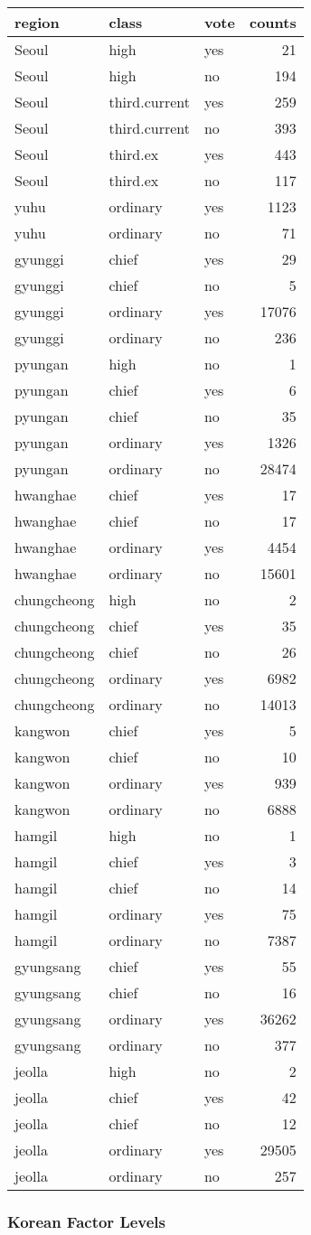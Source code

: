 \documentclass[
]{article}
\begin{document}
\begin{longtable}[]{@{}lllr@{}}
\toprule
region & class & vote & counts\tabularnewline
\midrule
\endhead
Seoul & high & yes & 21\tabularnewline
Seoul & high & no & 194\tabularnewline
Seoul & third.current & yes & 259\tabularnewline
Seoul & third.current & no & 393\tabularnewline
Seoul & third.ex & yes & 443\tabularnewline
Seoul & third.ex & no & 117\tabularnewline
yuhu & ordinary & yes & 1123\tabularnewline
yuhu & ordinary & no & 71\tabularnewline
gyunggi & chief & yes & 29\tabularnewline
gyunggi & chief & no & 5\tabularnewline
gyunggi & ordinary & yes & 17076\tabularnewline
gyunggi & ordinary & no & 236\tabularnewline
pyungan & high & no & 1\tabularnewline
pyungan & chief & yes & 6\tabularnewline
pyungan & chief & no & 35\tabularnewline
pyungan & ordinary & yes & 1326\tabularnewline
pyungan & ordinary & no & 28474\tabularnewline
hwanghae & chief & yes & 17\tabularnewline
hwanghae & chief & no & 17\tabularnewline
hwanghae & ordinary & yes & 4454\tabularnewline
hwanghae & ordinary & no & 15601\tabularnewline
chungcheong & high & no & 2\tabularnewline
chungcheong & chief & yes & 35\tabularnewline
chungcheong & chief & no & 26\tabularnewline
chungcheong & ordinary & yes & 6982\tabularnewline
chungcheong & ordinary & no & 14013\tabularnewline
kangwon & chief & yes & 5\tabularnewline
kangwon & chief & no & 10\tabularnewline
kangwon & ordinary & yes & 939\tabularnewline
kangwon & ordinary & no & 6888\tabularnewline
hamgil & high & no & 1\tabularnewline
hamgil & chief & yes & 3\tabularnewline
hamgil & chief & no & 14\tabularnewline
hamgil & ordinary & yes & 75\tabularnewline
hamgil & ordinary & no & 7387\tabularnewline
gyungsang & chief & yes & 55\tabularnewline
gyungsang & chief & no & 16\tabularnewline
gyungsang & ordinary & yes & 36262\tabularnewline
gyungsang & ordinary & no & 377\tabularnewline
jeolla & high & no & 2\tabularnewline
jeolla & chief & yes & 42\tabularnewline
jeolla & chief & no & 12\tabularnewline
jeolla & ordinary & yes & 29505\tabularnewline
jeolla & ordinary & no & 257\tabularnewline
\bottomrule
\end{longtable}

\hypertarget{korean-factor-levels}{%
\subsubsection{Korean Factor Levels}\label{korean-factor-levels}}
\end{document}
